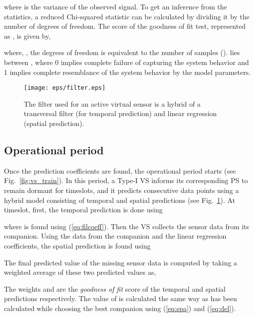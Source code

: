 \documentclass[a4paper,conference]{IEEEtran}
\begin{document}
where  is the variance of the observed signal. To get an inference from the statistics, a reduced Chi-squared statistic can be calculated by dividing it by the number of degrees of freedom. The score of the goodness of fit test, represented as , is given by, 

where, , the degrees of freedom is equivalent to the number of samples ().  lies between , where 0 implies complete failure of capturing the system behavior and 1 implies complete resemblance of the system behavior by the model parameters.
\begin{figure}[]
\centering
\texttt{[image: eps/filter.eps]}
\caption{The filter used for an active virtual sensor is a hybrid of a transversal filter (for temporal prediction) and linear regression (spatial prediction).}
\label{fig:filter}
\end{figure}
\subsection{Operational period}
Once the prediction coefficients are found, the operational period starts (see Fig.~\ref{fig:vs_train}). In this period, a Type-I VS informs its corresponding PS to remain dormant for  timeslots, and it predicts consecutive  data points using a hybrid model consisting of temporal and spatial predictions (see Fig.~\ref{fig:filter}).
At  timeslot, first, the temporal prediction is done using

where  is found using (\ref{eq:filcoeff}). Then the VS collects the sensor data from its companion. Using the data from the companion and the linear regression coefficients, the spatial prediction is found using 

The final predicted value of the missing sensor data is computed by taking a weighted average of these two predicted values as,

The weights  and  are the {\it goodness of fit} score of the temporal and spatial predictions respectively. The value of  is calculated the same way as  has been calculated while choosing the best companion using (\ref{eq:spa}) and (\ref{eq:del}).
\end{document}
